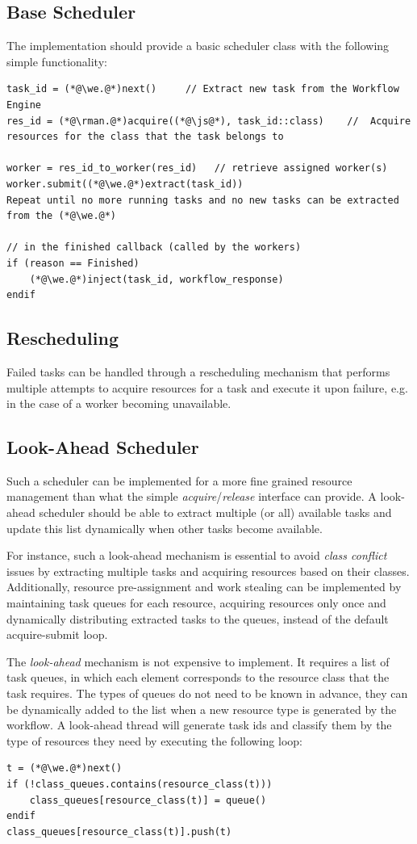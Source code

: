 \documentclass[10pt]{article}
\newcommand{\rman}{RM\xspace}
\newcommand{\we}{WE\xspace}
\begin{document}
\subsection{Base Scheduler}
\label{sec:basesched}
The implementation should provide a basic scheduler class with the following
simple functionality:
\begin{lstlisting}
task_id = (*@\we.@*)next()     // Extract new task from the Workflow Engine
res_id = (*@\rman.@*)acquire((*@\js@*), task_id::class)    //  Acquire resources for the class that the task belongs to

worker = res_id_to_worker(res_id)   // retrieve assigned worker(s)
worker.submit((*@\we.@*)extract(task_id))
Repeat until no more running tasks and no new tasks can be extracted from the (*@\we.@*)

// in the finished callback (called by the workers)
if (reason == Finished)
    (*@\we.@*)inject(task_id, workflow_response)
endif
\end{lstlisting}

\subsection{Rescheduling}
Failed tasks can be handled through a rescheduling mechanism that performs
multiple attempts to acquire resources for a task and execute it upon failure,
e.g. in the case of a worker becoming unavailable. 

\subsection{Look-Ahead Scheduler}

Such a scheduler can be implemented for a more fine grained resource management
than what the simple \emph{acquire}/\emph{release} interface can provide. A
look-ahead scheduler should be able to extract multiple (or all) available tasks
and update this list dynamically when other tasks become available.

For instance, such a look-ahead mechanism is essential to avoid \emph{class
conflict} issues by extracting multiple tasks and acquiring resources based on
their classes.
Additionally, resource pre-assignment and work stealing can be implemented by
maintaining task queues for each resource, acquiring resources only once and
dynamically distributing extracted tasks to the queues, instead of the default
acquire-submit loop.

The \emph{look-ahead} mechanism is not expensive to implement.
It requires a list of task queues, in which each element corresponds to the 
resource class that the task requires. The types of queues do not need to be 
known in advance, they can be dynamically added to the list when a new resource 
type is generated by the workflow.
A look-ahead thread will generate task ids and classify them by the type of 
resources they need by executing the following loop:
\begin{lstlisting}
t = (*@\we.@*)next()
if (!class_queues.contains(resource_class(t)))
    class_queues[resource_class(t)] = queue()
endif 
class_queues[resource_class(t)].push(t)
\end{lstlisting}
\end{document}
